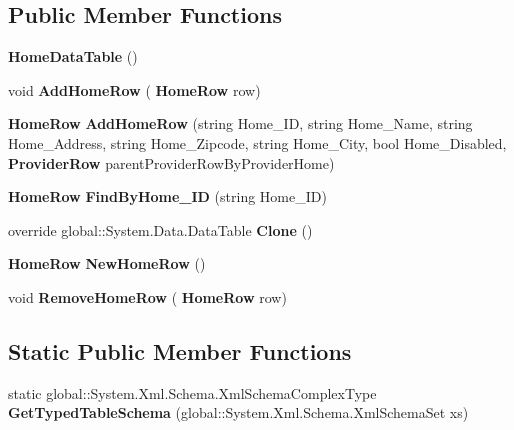 \subsection*{Public Member Functions}
\begin{DoxyCompactItemize}
\item 
\textbf{ Home\+Data\+Table} ()
\item 
void \textbf{ Add\+Home\+Row} (\textbf{ Home\+Row} row)
\item 
\textbf{ Home\+Row} \textbf{ Add\+Home\+Row} (string Home\+\_\+\+ID, string Home\+\_\+\+Name, string Home\+\_\+\+Address, string Home\+\_\+\+Zipcode, string Home\+\_\+\+City, bool Home\+\_\+\+Disabled, \textbf{ Provider\+Row} parent\+Provider\+Row\+By\+Provider\+Home)
\item 
\textbf{ Home\+Row} \textbf{ Find\+By\+Home\+\_\+\+ID} (string Home\+\_\+\+ID)
\item 
override global\+::\+System.\+Data.\+Data\+Table \textbf{ Clone} ()
\item 
\textbf{ Home\+Row} \textbf{ New\+Home\+Row} ()
\item 
void \textbf{ Remove\+Home\+Row} (\textbf{ Home\+Row} row)
\end{DoxyCompactItemize}
\subsection*{Static Public Member Functions}
\begin{DoxyCompactItemize}
\item 
static global\+::\+System.\+Xml.\+Schema.\+Xml\+Schema\+Complex\+Type \textbf{ Get\+Typed\+Table\+Schema} (global\+::\+System.\+Xml.\+Schema.\+Xml\+Schema\+Set xs)
\end{DoxyCompactItemize}
